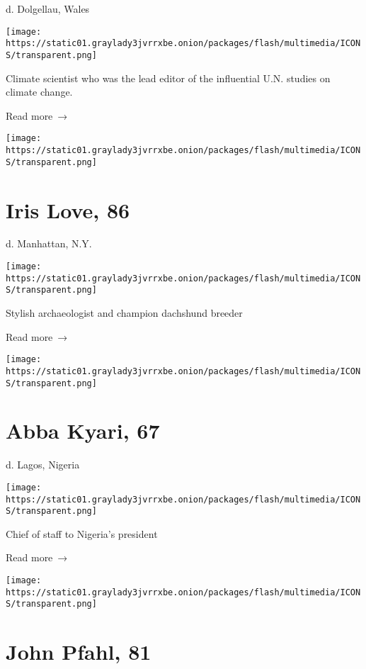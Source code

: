 d. Dolgellau, Wales

\texttt{[image: https://static01.graylady3jvrrxbe.onion/packages/flash/multimedia/ICONS/transparent.png]}

Climate scientist who was the lead editor of the influential U.N.
studies on climate change.

 Read more~→

\href{https://www.nytimes3xbfgragh.onion/2020/04/23/nyregion/iris-love-dead.html}{}

\texttt{[image: https://static01.graylady3jvrrxbe.onion/packages/flash/multimedia/ICONS/transparent.png]}

\hypertarget{iris-love-86}{%
\section{Iris Love, 86}\label{iris-love-86}}

d. Manhattan, N.Y.

\texttt{[image: https://static01.graylady3jvrrxbe.onion/packages/flash/multimedia/ICONS/transparent.png]}

Stylish archaeologist and champion dachshund breeder

 Read more~→

\href{https://www.nytimes3xbfgragh.onion/2020/04/23/obituaries/abba-kyari-dead-coronavirus.html}{}

\texttt{[image: https://static01.graylady3jvrrxbe.onion/packages/flash/multimedia/ICONS/transparent.png]}

\hypertarget{abba-kyari-67}{%
\section{Abba Kyari, 67}\label{abba-kyari-67}}

d. Lagos, Nigeria

\texttt{[image: https://static01.graylady3jvrrxbe.onion/packages/flash/multimedia/ICONS/transparent.png]}

Chief of staff to Nigeria's president

 Read more~→

\href{https://www.nytimes3xbfgragh.onion/2020/04/23/arts/john-pfahl-photographer-who-played-with-landscapes-dies-at-81.html}{}

\texttt{[image: https://static01.graylady3jvrrxbe.onion/packages/flash/multimedia/ICONS/transparent.png]}

\hypertarget{john-pfahl-81}{%
\section{John Pfahl, 81}\label{john-pfahl-81}}

